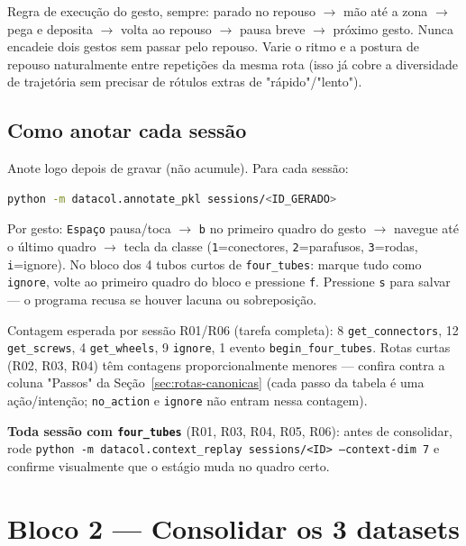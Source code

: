 \documentclass[11pt,a4paper]{article}
\begin{document}
Regra de execução do gesto, sempre: parado no repouso $\to$ mão até a zona
$\to$ pega e deposita $\to$ volta ao repouso $\to$ pausa breve $\to$ próximo
gesto. Nunca encadeie dois gestos sem passar pelo repouso. Varie o ritmo e a
postura de repouso naturalmente entre repetições da mesma rota (isso já
cobre a diversidade de trajetória sem precisar de rótulos extras de
"rápido"/"lento").

\subsection{Como anotar cada sessão}

Anote logo depois de gravar (não acumule). Para cada sessão:

\begin{lstlisting}[language=bash]
python -m datacol.annotate_pkl sessions/<ID_GERADO>
\end{lstlisting}

Por gesto: \texttt{Espaço} pausa/toca $\to$ \texttt{b} no primeiro quadro do
gesto $\to$ navegue até o último quadro $\to$ tecla da classe
(\texttt{1}=conectores, \texttt{2}=parafusos, \texttt{3}=rodas,
\texttt{i}=ignore). No bloco dos 4 tubos curtos de \texttt{four\_tubes}:
marque tudo como \texttt{ignore}, volte ao primeiro quadro do bloco e
pressione \texttt{f}. Pressione \texttt{s} para salvar --- o programa recusa
se houver lacuna ou sobreposição.

Contagem esperada por sessão R01/R06 (tarefa completa): 8
\texttt{get\_connectors}, 12 \texttt{get\_screws}, 4 \texttt{get\_wheels}, 9
\texttt{ignore}, 1 evento \texttt{begin\_four\_tubes}. Rotas curtas (R02,
R03, R04) têm contagens proporcionalmente menores --- confira contra a
coluna "Passos" da Seção~\ref{sec:rotas-canonicas} (cada passo da tabela é
uma ação/intenção; \texttt{no\_action} e \texttt{ignore} não entram nessa
contagem).

\textbf{Toda sessão com \texttt{four\_tubes}} (R01, R03, R04, R05, R06):
antes de consolidar, rode
\texttt{python -m datacol.context\_replay sessions/<ID> --context-dim 7} e
confirme visualmente que o estágio muda no quadro certo.

\section{Bloco 2 --- Consolidar os 3 datasets}
\label{sec:consolidacao}
\end{document}
